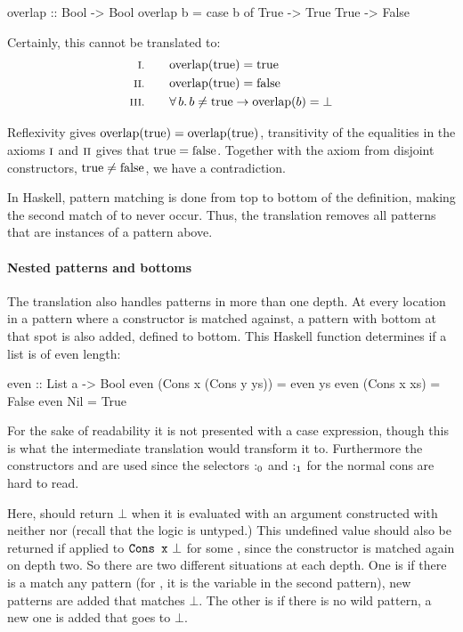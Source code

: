 \begin{code}
overlap :: Bool -> Bool
overlap b = case b of
              True -> True
              True -> False
\end{code}

Certainly, this cannot be translated to:
\begin{align*}
\rom{1} \qquad & \fn{overlap}(\fn{true}) = \fn{true} \\
\rom{2} \qquad & \fn{overlap}(\fn{true}) = \fn{false} \\
\rom{3} \qquad & \fa{b} b \neq \fn{true} \rightarrow \fn{overlap}(b) = \bot
\end{align*}

Reflexivity gives $\mathrm{overlap}(\mathrm{true}) = \mathrm{overlap}(\mathrm{true})$,
transitivity of the equalities in the axioms $\romnodot{1}$ and
$\romnodot{2}$ gives that $\mathrm{true} = \mathrm{false}$. Together with the
axiom from disjoint constructors, $\mathrm{true} \neq \mathrm{false}$, we have
a contradiction.

In Haskell, pattern matching is done from top to bottom of the
definition, making the second match of  to never occur. Thus,
the translation removes all patterns that are instances of a pattern
above.



\paragraph{Nested patterns and bottoms} The translation also handles
patterns in more than one depth. At every location in a pattern where
a constructor is matched against, a pattern with bottom at that spot
is also added, defined to bottom. This Haskell function 
determines if a list is of even length:

\begin{code}
even :: List a -> Bool
even (Cons x (Cons y ys)) = even ys
even (Cons x xs)          = False
even Nil                  = True
\end{code}

\noindent
For the sake of readability it is not presented with a case
expression, though this is what the intermediate translation would
transform it to. Furthermore the constructors  and 
are used since the selectors $\mathrm{:_0}$ and $\mathrm{:_1}$ for the
normal cons are hard to read.

Here,  should return $\bot$ when it is evaluated with an
argument constructed with neither  nor  (recall that
the logic is untyped.) This undefined value should also be returned if
applied to $\hs{Cons x\w}\bot$ for some , since the 
constructor is matched again on depth two. So there are two different
situations at each depth. One is if there is a match any pattern (for
, it is the variable  in the second pattern), new
patterns are added that matches $\bot$. The other is if there is no
wild pattern, a new one is added that goes to $\bot$.


